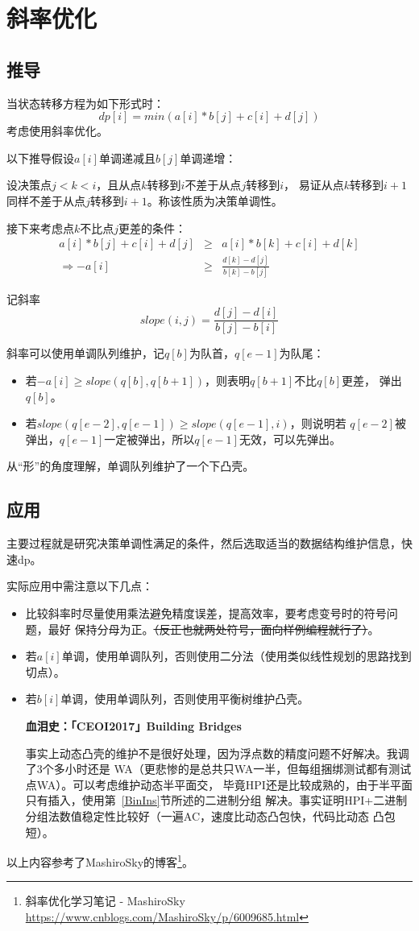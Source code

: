 \section{斜率优化}\label{Slope}
\subsection{推导}
当状态转移方程为如下形式时：
\begin{displaymath}
    dp[i]=min(a[i]*b[j]+c[i]+d[j])
\end{displaymath}
考虑使用斜率优化。

以下推导假设$a[i]$单调递减且$b[j]$单调递增：

设决策点$j<k<i$，且从点$k$转移到$i$不差于从点$j$转移到$i$，
易证从点$k$转移到$i+1$同样不差于从点$j$转移到$i+1$。称该性质为决策单调性。

接下来考虑点$k$不比点$j$更差的条件：
\begin{eqnarray*}
    a[i]*b[j]+c[i]+d[j]&\geq&a[i]*b[k]+c[i]+d[k]\\
    \Rightarrow -a[i]&\geq&\frac{d[k]-d[j]}{b[k]-b[j]}
\end{eqnarray*}

记斜率
\begin{displaymath}
    slope(i,j)=\frac{d[j]-d[i]}{b[j]-b[i]}
\end{displaymath}

斜率可以使用单调队列维护，记$q[b]$为队首，$q[e-1]$为队尾：
\begin{itemize}
    \item 若$-a[i]\geq slope(q[b],q[b+1])$，则表明$q[b+1]$不比$q[b]$更差，
    弹出$q[b]$。
    \item 若$slope(q[e-2],q[e-1])\geq slope(q[e-1],i)$，则说明若
    $q[e-2]$被弹出，$q[e-1]$一定被弹出，所以$q[e-1]$无效，可以先弹出。
\end{itemize}

从``形''的角度理解，单调队列维护了一个下凸壳。
\subsection{应用}
主要过程就是研究决策单调性满足的条件，然后选取适当的数据结构维护信息，快速dp。

实际应用中需注意以下几点：
\begin{itemize}
    \item 比较斜率时尽量使用乘法避免精度误差，提高效率，要考虑变号时的符号问题，最好
    保持分母为正。\sout{（反正也就两处符号，面向样例编程就行了）}。
    \item 若$a[i]$单调，使用单调队列，否则使用二分法（使用类似线性规划的思路找到切点）。
    \item 若$b[i]$单调，使用单调队列，否则使用平衡树维护凸壳。

    {\bfseries 血泪史：「CEOI2017」Building Bridges

    事实上动态凸壳的维护不是很好处理，因为浮点数的精度问题不好解决。我调了3个多小时还是
    WA（更悲惨的是总共只WA一半，但每组捆绑测试都有测试点WA）。可以考虑维护动态半平面交，
    毕竟HPI还是比较成熟的，由于半平面只有插入，使用第~\ref{BinIns}节所述的二进制分组
    解决。事实证明HPI+二进制分组法数值稳定性比较好（一遍AC，速度比动态凸包快，代码比动态
    凸包短）。
    }
\end{itemize}

以上内容参考了MashiroSky的博客\footnote{斜率优化学习笔记 - MashiroSky
    \url{https://www.cnblogs.com/MashiroSky/p/6009685.html}
}。
